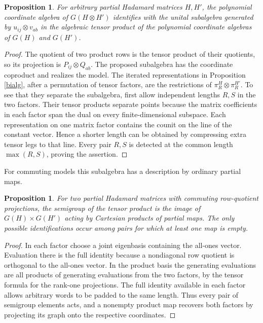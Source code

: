 \documentclass[11pt,a4paper]{article}
\newtheorem{prop}[thm]{Proposition}
\begin{document}
\begin{prop}\label{tensorimage}
For arbitrary partial Hadamard matrices $H,H'$, the polynomial coordinate algebra of $G(H\otimes H')$ identifies with the unital subalgebra generated by $u_{ij}\otimes v_{ab}$ in the algebraic tensor product of the polynomial coordinate algebras of $G(H)$ and $G(H')$.
\end{prop}
\begin{proof}
The quotient of two product rows is the tensor product of their quotients, so its projection is $P_{ij}\otimes Q_{ab}$. The proposed subalgebra has the coordinate coproduct and realizes the model. The iterated representations in Proposition \ref{bialg}, after a permutation of tensor factors, are the restrictions of $\pi_R^H\otimes\pi_R^{H'}$. To see that they separate the subalgebra, first allow independent lengths $R,S$ in the two factors. Their tensor products separate points because the matrix coefficients in each factor span the dual on every finite-dimensional subspace. Each representation on one matrix factor contains the counit on the line of the constant vector. Hence a shorter length can be obtained by compressing extra tensor legs to that line. Every pair $R,S$ is detected at the common length $\max(R,S)$, proving the assertion.
\end{proof}

For commuting models this subalgebra has a description by ordinary partial maps.

\begin{prop}\label{product}
For two partial Hadamard matrices with commuting row-quotient projections, the semigroup of the tensor product is the image of $G(H)\times G(H')$ acting by Cartesian products of partial maps. The only possible identifications occur among pairs for which at least one map is empty.
\end{prop}
\begin{proof}
In each factor choose a joint eigenbasis containing the all-ones vector. Evaluation there is the full identity because a nondiagonal row quotient is orthogonal to the all-ones vector. In the product basis the generating evaluations are all products of generating evaluations from the two factors, by the tensor formula for the rank-one projections. The full identity available in each factor allows arbitrary words to be padded to the same length. Thus every pair of semigroup elements acts, and a nonempty product map recovers both factors by projecting its graph onto the respective coordinates.
\end{proof}
\end{document}

